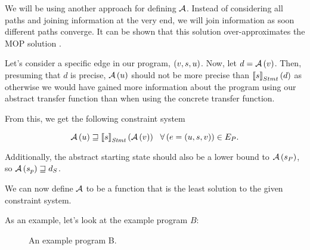 \documentclass[..thesis.tex]{subfiles}
\begin{document}
We will be using another approach for defining $\mathcal{A}$. Instead of considering all paths and joining information at the very end,
we will join information as soon different paths converge. It can be shown that this solution over-approximates the MOP solution \cite[80]{nielson_principles_1999}.

Let's consider a specific edge in our program, $\left( v, s, u \right)$. Now, let $d = \mathcal{A} \left( v \right)$. Then, presuming that $d$ is precise,
$\mathcal{A} \left( u \right) $ should not be more precise than $\left\llbracket s \right\rrbracket_{Stmt} \left( d \right)$ as otherwise we would have gained more information about
the program using our abstract transfer function than when using the concrete transfer function.

From this, we get the following constraint system

\begin{equation}
\label{constraints}
\mathcal{A} \left(  u \right) \sqsupseteq \left\llbracket s \right\rrbracket_{\mathit{Stmt}} \left( \mathcal{A} \left( v \right) \right) ~~ \forall \left( e = \left( u, s, v \right) \right) \in E_P \text{.}
\end{equation}

Additionally, the abstract starting state should also be a lower bound to $\mathcal{A} \left( s_P \right)$, so $\mathcal{A} \left( s_p \right) \sqsupseteq d_S$. 

We can now define $\mathcal{A}$ to be a function that is the least solution to the given constraint system.


As an example, let's look at the example program $B$: 

\begin{figure}[H]
  \centering
  \caption{An example program B.}
\end{figure}
\end{document}
